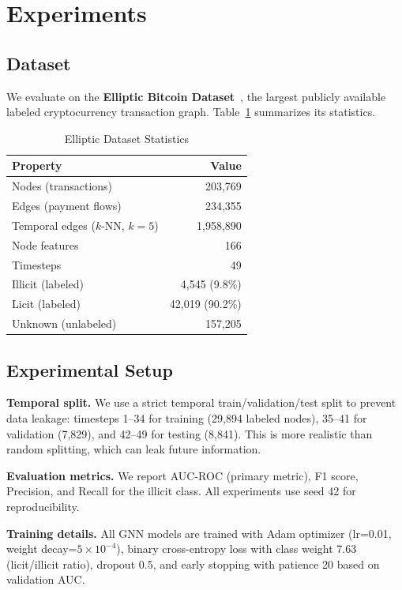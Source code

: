 \section{Experiments}

\subsection{Dataset}

We evaluate on the \textbf{Elliptic Bitcoin Dataset}~\cite{weber2019anti}, the largest publicly available labeled cryptocurrency transaction graph. Table~\ref{tab:dataset} summarizes its statistics.

\begin{table}[h]
\centering
\caption{Elliptic Dataset Statistics}
\label{tab:dataset}
\begin{tabular}{lr}
\toprule
\textbf{Property} & \textbf{Value} \\
\midrule
Nodes (transactions) & 203,769 \\
Edges (payment flows) & 234,355 \\
Temporal edges ($k$-NN, $k=5$) & 1,958,890 \\
Node features & 166 \\
Timesteps & 49 \\
Illicit (labeled) & 4,545 (9.8\%) \\
Licit (labeled) & 42,019 (90.2\%) \\
Unknown (unlabeled) & 157,205 \\
\bottomrule
\end{tabular}
\end{table}

\subsection{Experimental Setup}

\textbf{Temporal split.} We use a strict temporal train/validation/test split to prevent data leakage: timesteps 1--34 for training (29,894 labeled nodes), 35--41 for validation (7,829), and 42--49 for testing (8,841). This is more realistic than random splitting, which can leak future information.

\textbf{Evaluation metrics.} We report AUC-ROC (primary metric), F1 score, Precision, and Recall for the illicit class. All experiments use seed 42 for reproducibility.

\textbf{Training details.} All GNN models are trained with Adam optimizer (lr=0.01, weight decay=$5 \times 10^{-4}$), binary cross-entropy loss with class weight 7.63 (licit/illicit ratio), dropout 0.5, and early stopping with patience 20 based on validation AUC.

